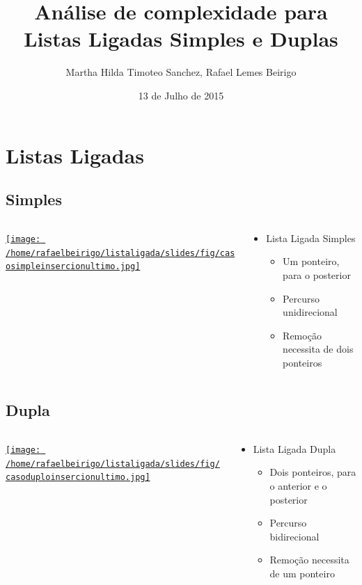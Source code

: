 \documentclass[bigger]{beamer}
\author{Martha Hilda Timoteo Sanchez, Rafael Lemes Beirigo}
\date{13 de Julho de 2015}
\title{Análise de complexidade para Listas Ligadas Simples e Duplas}
\begin{document}
\maketitle

\section{Listas Ligadas}
\label{sec-1}
\subsection{Simples}
\label{sec-1-1}
\begin{frame}[label=sec-1-1-1]{}
\begin{columns}
\begin{column}{0.6\textwidth}
\begin{center}
\href{fig/casosimpleinsercionultimo.jpg}{\texttt{[image: /home/rafaelbeirigo/listaligada/slides/fig/casosimpleinsercionultimo.jpg]}}
\end{center}
\end{column}
\begin{column}{0.4\textwidth}
\begin{itemize}
\item Lista Ligada Simples
\begin{itemize}
\item \alert{Um} ponteiro, para o posterior
\item Percurso unidirecional
\item Remoção necessita de dois ponteiros
\end{itemize}
\end{itemize}
\end{column}
\end{columns}
\end{frame}
\subsection{Dupla}
\label{sec-1-2}
\begin{frame}[label=sec-1-2-1]{}
\begin{columns}
\begin{column}{0.6\textwidth}
\begin{center}
\href{fig/casoduploinsercionultimo.jpg}{\texttt{[image: /home/rafaelbeirigo/listaligada/slides/fig/casoduploinsercionultimo.jpg]}}
\end{center}
\end{column}
\begin{column}{0.4\textwidth}
\begin{itemize}
\item Lista Ligada Dupla
\begin{itemize}
\item \alert{Dois} ponteiros, para o anterior e o posterior
\item Percurso bidirecional
\item Remoção necessita de um ponteiro
\end{itemize}
\end{itemize}
\end{column}
\end{columns}
\end{frame}
\end{document}
